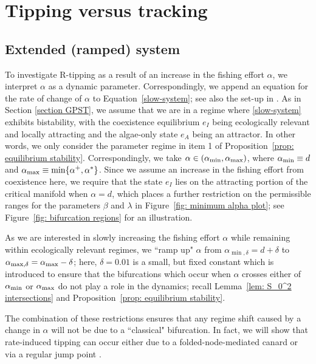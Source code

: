 \documentclass{article}
\theoremstyle{definition}
\numberwithin{equation}{section}
\begin{document}
\section{Tipping versus tracking}
\label{section R-tipping}


\subsection{Extended (ramped) system}
To investigate R-tipping as a result of an increase in the fishing effort $\alpha$, we interpret $\alpha$ as a dynamic parameter. Correspondingly, we append an equation for the rate of change of $\alpha$ to Equation~\eqref{slow-system}; see also the set-up in \cite{Plankton-tipping, vanselow_2019_when}.
As in Section \ref{section GPST}, we assume that we are in a regime where \eqref{slow-system} exhibits bistability, with the coexistence equilibrium $e_I$ being ecologically relevant and locally attracting and the algae-only state $e_A$ being an attractor. In other words, we only consider the parameter regime in item 1 of Proposition~\ref{prop: equilibrium stability}.
Correspondingly, we take $\alpha\in(\alpha_{\rm min},\alpha_{\rm max})$, where $\alpha_{\rm min}\equiv d$ and $\alpha_{\rm max}\equiv \min \{\alpha^+, \alpha^\ast\}$. Since we assume an increase in the fishing effort from coexistence here, we require that the state $e_I$ lies on the attracting portion of the critical manifold when $\alpha=d$, which places a further restriction on the permissible ranges for the parameters $\beta$ and $\lambda$ in Figure~\ref{fig: minimum alpha plot}; see Figure~\ref{fig: bifurcation regions} for an illustration.

As we are interested in slowly increasing the fishing effort $\alpha$ while remaining within ecologically relevant regimes, we ``ramp up" $\alpha$ from $\alpha_{\min,\delta} = d+\delta$ to $\alpha_{\max,\delta} = \alpha_{\rm max}-\delta$; here, $\delta=0.01$ is a small, but fixed constant which is introduced to ensure that the bifurcations which occur when $\alpha$ crosses either of $\alpha_{\rm min}$ or $\alpha_{\rm max}$ do not play a role in the dynamics; recall Lemma~\ref{lem: S_0^2 intersections} and Proposition~\ref{prop: equilibrium stability}.

The combination of these restrictions ensures that any regime shift caused by a change in $\alpha$ will not be due to a ``classical" bifurcation. In fact, we will show that rate-induced tipping can occur either due to a folded-node-mediated canard \cite{SZMOLYAN2001419, Canards} or via a regular jump point \cite{fold}. 
\end{document}
